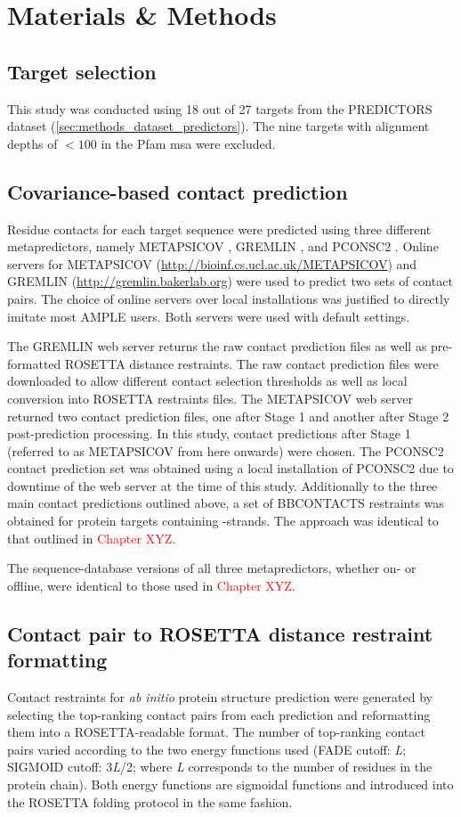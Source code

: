\section{Materials \& Methods}
\subsection{Target selection}
This study was conducted using 18 out of 27 targets from the PREDICTORS dataset (\cref{sec:methods_dataset_predictors}). The nine targets with alignment depths of $<100$ in the Pfam \gls{msa} were excluded.

\subsection{Covariance-based contact prediction}
Residue contacts for each target sequence were predicted using three different metapredictors, namely METAPSICOV \cite{Jones2015-vq}, GREMLIN \cite{Kamisetty2013-le}, and PCONSC2 \cite{Skwark2014-qp}. Online servers for METAPSICOV (\url{http://bioinf.cs.ucl.ac.uk/METAPSICOV}) and GREMLIN (\url{http://gremlin.bakerlab.org}) were used to predict two sets of contact pairs. The choice of online servers over local installations was justified to directly imitate most AMPLE users. Both servers were used with default settings.

The GREMLIN web server returns the raw contact prediction files as well as pre-formatted ROSETTA distance restraints. The raw contact prediction files were downloaded to allow different contact selection thresholds as well as local conversion into ROSETTA restraints files. The METAPSICOV web server returned two contact prediction files, one after Stage 1 and another after Stage 2 post-prediction processing. In this study, contact predictions after Stage 1 (referred to as METAPSICOV from here onwards) were chosen. The PCONSC2 contact prediction set was obtained using a local installation of PCONSC2 due to downtime of the web server at the time of this study. Additionally to the three main contact predictions outlined above, a set of BBCONTACTS restraints was obtained for protein targets containing \textbeta-strands. The approach was identical to that outlined in \textcolor{red}{Chapter XYZ}.

The sequence-database versions of all three metapredictors, whether on- or offline, were identical to those used in \textcolor{red}{Chapter XYZ}.

\subsection{Contact pair to ROSETTA distance restraint formatting}
Contact restraints for \textit{ab initio} protein structure prediction were generated by selecting the top­-ranking contact pairs from each prediction and reformatting them into a ROSETTA-readable format. The number of top-­ranking contact pairs varied according to the two energy functions used (FADE cutoff: \textit{L}; SIGMOID cutoff: 3\textit{L}/2; where \textit{L} corresponds to the number of residues in the protein chain). Both energy functions are sigmoidal functions and introduced into the ROSETTA folding protocol in the same fashion. 

